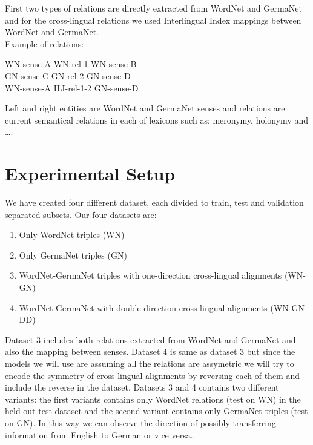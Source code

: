 First two types of relations are directly extracted from WordNet and GermaNet and for the 
cross-lingual relations we used Interlingual Index mappings between WordNet and GermaNet.
\\
Example of relations:
\begin{center}
WN-sense-A \hspace{0.3in}  WN-rel-1    \hspace{0.3in}  WN-sense-B\\
GN-sense-C \hspace{0.3in}  GN-rel-2    \hspace{0.3in}  GN-sense-D\\
WN-sense-A \hspace{0.3in}  ILI-rel-1-2 \hspace{0.3in}  GN-sense-D\\
\end{center}

Left and right entities are WordNet and GermaNet senses and relations are current semantical relations
 in each of lexicons such as:
 meronymy, holonymy and \ldots.


\section{Experimental Setup}
\label{sec:xkb-exp}

 
 We have created four different dataset, each divided to train, test and validation separated subsets. Our four datasets are:
 \begin{enumerate}
 \item Only WordNet triples (WN)
 \item Only GermaNet triples (GN)
 \item WordNet-GermaNet triples with one-direction cross-lingual alignments (WN-GN)
 \item WordNet-GermaNet with double-direction cross-lingual alignments (WN-GN DD)
 \end{enumerate}
 
 Dataset 3 includes both relations extracted from WordNet and GermaNet and also the mapping between senses.
 Dataset 4 is same as dataset 3 but since the models we will use are assuming all the relations are assymetric 
 we will try to encode the symmetry of cross-lingual alignments by reversing each of them and include the reverse in the dataset.
 Datasets 3 and 4 contains two different variants: the first variants contains only WordNet relations (test on WN) 
 in the held-out test dataset and the second variant contains only GermaNet triples (test on GN).
  In this way we can observe the direction of
  possibly transferring information from English to German or vice versa.
  
